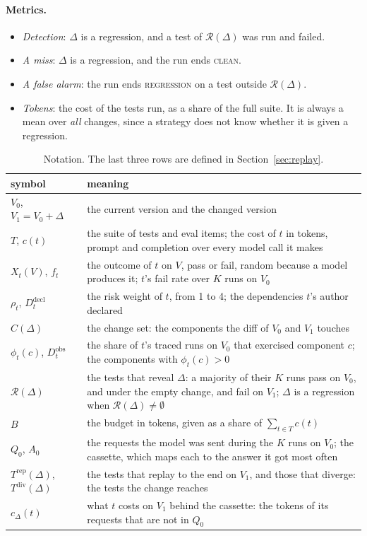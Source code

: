 \documentclass[11pt,a4paper]{article}
\newcommand{\Rev}{\mathcal{R}}
\newcommand{\clean}{\textsc{clean}}
\newcommand{\regression}{\textsc{regression}}
\begin{document}
\paragraph{Metrics.}
\begin{itemize}
  \item \emph{Detection}: $\Delta$ is a regression, and a test of $\Rev(\Delta)$ was run and failed.
  \item \emph{A miss}: $\Delta$ is a regression, and the run ends \clean{}.
  \item \emph{A false alarm}: the run ends \regression{} on a test outside $\Rev(\Delta)$.
  \item \emph{Tokens}: the cost of the tests run, as a share of the full suite. It is always a mean over
        \emph{all} changes, since a strategy does not know whether it is given a regression.
\end{itemize}

\begin{table}[H]
\centering\small
\caption{Notation. The last three rows are defined in Section~\ref{sec:replay}.}
\label{tab:notation}
\begin{tabular}{lp{104mm}}
\toprule
symbol & meaning \\
\midrule
$V_0$, $V_1 = V_0 + \Delta$ & the current version and the changed version \\
$T$, $c(t)$ & the suite of tests and eval items; the cost of $t$ in tokens, prompt and completion over every model call it makes \\
$X_t(V)$, $f_t$ & the outcome of $t$ on $V$, pass or fail, random because a model produces it; $t$'s fail rate over $K$ runs on $V_0$ \\
$\rho_t$, $D^{\mathrm{decl}}_t$ & the risk weight of $t$, from 1 to 4; the dependencies $t$'s author declared \\
$C(\Delta)$ & the change set: the components the diff of $V_0$ and $V_1$ touches \\
$\phi_t(c)$, $D^{\mathrm{obs}}_t$ & the share of $t$'s traced runs on $V_0$ that exercised component $c$; the components with $\phi_t(c) > 0$ \\
$\Rev(\Delta)$ & the tests that reveal $\Delta$: a majority of their $K$ runs pass on $V_0$, and under the empty change, and fail on $V_1$; $\Delta$ is a regression when $\Rev(\Delta) \neq \emptyset$ \\
$B$ & the budget in tokens, given as a share of $\sum_{t \in T} c(t)$ \\
\midrule
$Q_0$, $A_0$ & the requests the model was sent during the $K$ runs on $V_0$; the cassette, which maps each to the answer it got most often \\
$T^{\mathrm{rep}}(\Delta)$, $T^{\mathrm{div}}(\Delta)$ & the tests that replay to the end on $V_1$, and those that diverge: the tests the change reaches \\
$c_\Delta(t)$ & what $t$ costs on $V_1$ behind the cassette: the tokens of its requests that are not in $Q_0$ \\
\bottomrule
\end{tabular}
\end{table}
\end{document}
